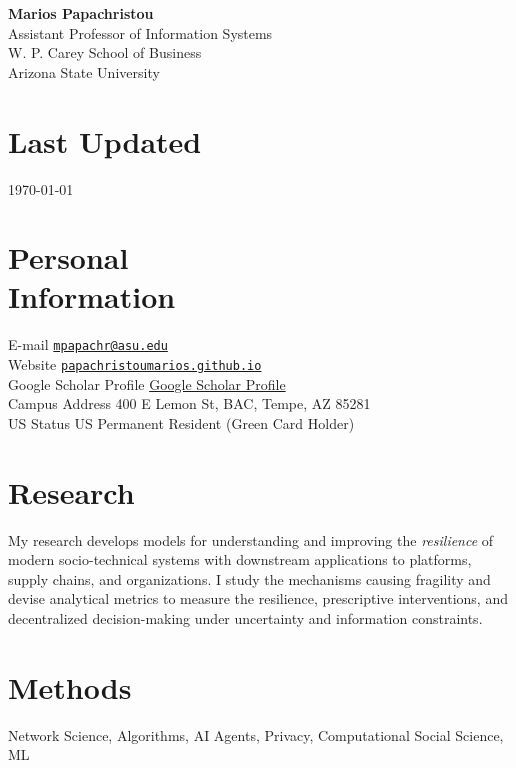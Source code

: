 \documentclass[margin]{res}
\begin{document}
\begin{center}
{\Large \textbf{Marios Papachristou}} \\ Assistant Professor of Information Systems \\ W. P. Carey School of Business \\ Arizona State University
\end{center}
\vspace{-1em}

\begin{resume}

 \section{Last Updated} \today

\section{Personal \\ Information} 
E-mail \hfill \href{mailto:mpapachr@asu.edu}{\nolinkurl{mpapachr@asu.edu}}\\
Website \hfill \href{https://papachristoumarios.github.io}{\nolinkurl{papachristoumarios.github.io}} \\
Google Scholar Profile \hfill \href{https://scholar.google.gr/citations?user=T12JO3MAAAAJ&hl=en}{Google Scholar Profile} \\
Campus Address \hfill 400 E Lemon St, BAC, Tempe, AZ 85281 \\
US Status \hfill US Permanent Resident (Green Card Holder)


\section{Research} My research develops models for understanding and improving the \textit{resilience} of modern socio-technical systems with downstream applications to platforms, supply chains, and organizations. I study the mechanisms causing fragility and devise analytical metrics to measure the resilience, prescriptive interventions, and decentralized decision-making under uncertainty and information constraints. 


\section{Methods} Network Science, Algorithms, AI Agents, Privacy, Computational Social Science, ML 




\end{resume}
\end{document}
